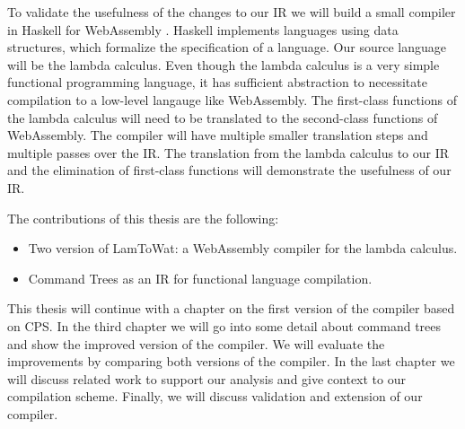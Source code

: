 To validate the usefulness of the changes to our IR we will build a small compiler in Haskell \autocite{haskellhomepage} for WebAssembly \autocite{webassemblyhomepage}. Haskell implements languages using data structures, which formalize the specification of a language. Our source language will be the lambda calculus. Even though the lambda calculus is a very simple functional programming language, it has sufficient abstraction to necessitate compilation to a low-level langauge like WebAssembly. The first-class functions of the lambda calculus will need to be translated to the second-class functions of WebAssembly. The compiler will have multiple smaller translation steps and multiple passes over the IR. The translation from the lambda calculus to our IR and the elimination of first-class functions will demonstrate the usefulness of our IR.

The contributions of this thesis are the following:
\begin{itemize}
\item Two version of LamToWat: a WebAssembly compiler for the lambda calculus.
\item Command Trees as an IR for functional language compilation.
\end{itemize}

This thesis will continue with a chapter on the first version of the compiler based on CPS. In the third chapter we will go into some detail about command trees and show the improved version of the compiler. We will evaluate the improvements by comparing both versions of the compiler. In the last chapter we will discuss related work to support our analysis and give context to our compilation scheme. Finally, we will discuss validation and extension of our compiler.